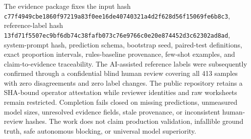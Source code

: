 The evidence package fixes the input hash
\texttt{c77f4949cbe1860f97219a83f0ee16de40740321a4d2f628d56f15069fe6b8c3}, reference-label hash
\texttt{13fd71f5507ec9bf6db74c38fafb073c76e9766c0e20e874452d3c62302ad8ad}, system-prompt hash, prediction schema, bootstrap
seed, paired-test definitions, exact proportion intervals, rules-baseline provenance,
few-shot examples, and claim-to-evidence traceability. The AI-assisted reference labels
were subsequently confirmed through a confidential blind human review covering all 413
samples with zero disagreements and zero label changes. The public repository retains a
SHA-bound operator attestation while reviewer identities and raw worksheets remain
restricted. Completion fails closed on missing predictions, unmeasured model sizes,
unresolved evidence fields, stale provenance, or inconsistent human-review hashes. The
work does not claim production validation, infallible ground truth, safe autonomous
blocking, or universal model superiority.
